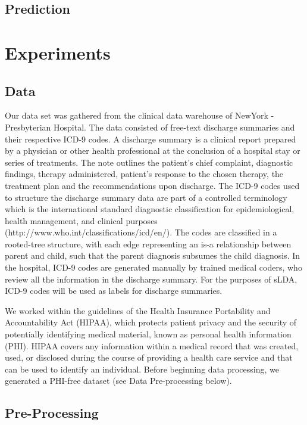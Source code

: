 \documentclass{article}
\begin{document}
\subsection{Prediction}

\section{Experiments}

\subsection{Data}

Our data set was gathered from the clinical data warehouse of NewYork
- Presbyterian Hospital. The data consisted of free-text discharge
summaries and their respective ICD-9 codes. A discharge summary is
a clinical report prepared by a physician or other health professional
at the conclusion of a hospital stay or series of treatments. The
note outlines the patient\textquoteright{}s chief complaint, diagnostic
findings, therapy administered, patient\textquoteright{}s response
to the chosen therapy, the treatment plan and the recommendations
upon discharge. The ICD-9 codes used to structure the discharge summary
data are part of a controlled terminology which is the international
standard diagnostic classification for epidemiological, health management,
and clinical purposes (http://www.who.int/classifications/icd/en/).
The codes are classified in a rooted-tree structure, with each edge
representing an is-a relationship between parent and child, such that
the parent diagnosis subsumes the child diagnosis. In the hospital,
ICD-9 codes are generated manually by trained medical coders, who
review all the information in the discharge summary. For the purposes
of sLDA, ICD-9 codes will be used as labels for discharge summaries.

We worked within the guidelines of the Health Insurance Portability
and Accountability Act (HIPAA), which protects patient privacy and
the security of potentially identifying medical material, known as
personal health information (PHI). HIPAA covers any information within
a medical record that was created, used, or disclosed during the course
of providing a health care service and that can be used to identify
an individual. Before beginning data processing, we generated a PHI-free
dataset (see Data Pre-processing below).


\subsection{Pre-Processing}
\end{document}
